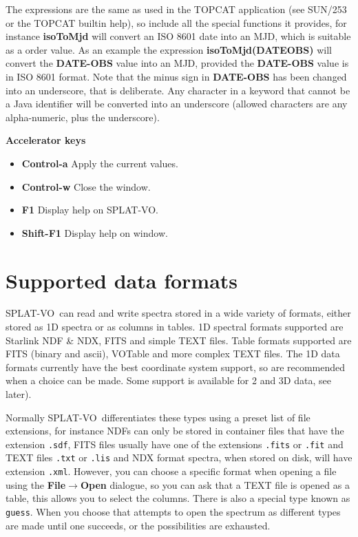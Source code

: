 \documentclass[twoside,11pt]{article}
\newcommand{\latexhtml}[2]{#1}
\newcommand{\xlabel}[1]{}
\renewcommand{\_}{\texttt{\symbol{95}}}
\newcommand{\SPLAT}{\textsf{SPLAT-VO}}
\newcommand{\submenuitem}[2]{\latexhtml{\textbf{#1$\rightarrow$#2}}{\textbf{#1->#2}}}
\newcommand{\labelitem}[1]{\textbf{#1}}
\newcommand{\hitext}[1]{\texttt{#1}}
\newcommand{\subheading}[1]{\textbf{\large{#1}}}
\begin{document}
The expressions are the same as used in the TOPCAT application (see SUN/253 or
the TOPCAT builtin help), so include all the special functions it provides,
for instance \labelitem{isoToMjd} will convert an ISO 8601 date into an MJD,
which is suitable as a order value. As an example the expression
\labelitem{isoToMjd(DATE\_OBS)} will convert the
\labelitem{DATE-OBS} value into an MJD, provided the \labelitem{DATE-OBS}
value is in ISO 8601 format. Note that the minus sign in \labelitem{DATE-OBS}
has been changed into an underscore, that is deliberate. Any character in a
keyword that cannot be a Java identifier will be converted into an underscore
(allowed characters are any alpha-numeric, plus the underscore).

\subheading{Accelerator keys}

\begin{itemize}
\item \labelitem{Control-a} Apply the current values.

\item \labelitem{Control-w} Close the window.
\item \labelitem{F1} Display help on \SPLAT.
\item \labelitem{Shift-F1} Display help on window.
\end{itemize}

\newpage
\section{Supported data formats\xlabel{data_formats}}

\SPLAT\ can read and write spectra stored in a wide variety of formats, either
stored as 1D spectra or as columns in tables. 1D spectral formats supported
are Starlink NDF \& NDX, FITS and simple TEXT files. Table formats supported
are FITS (binary and ascii), VOTable and more complex TEXT files. The 1D data
formats currently have the best coordinate system support, so are recommended
when a choice can be made. Some support is available for 2 and 3D data, see
later).

Normally \SPLAT\ differentiates these types using a preset list of file
extensions, for instance NDFs can only be stored in container files that have
the extension \hitext{.sdf}, FITS files usually have one of the extensions
\hitext{.fits} or \hitext{.fit} and TEXT files \hitext{.txt} or \hitext{.lis}
and NDX format spectra, when stored on disk, will have extension
\hitext{.xml}. However, you can choose a specific format when opening a file
using the \submenuitem{File}{Open} dialogue, so you can ask that a TEXT file
is opened as a table, this allows you to select the columns. There is also a
special type known as \hitext{guess}. When you choose that attempts to open
the spectrum as different types are made until one succeeds, or the
possibilities are exhausted.
\end{document}
